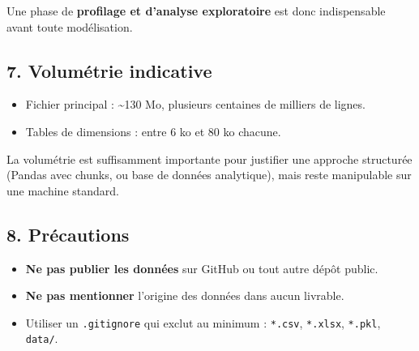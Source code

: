 \documentclass[11pt,a4paper]{article}
\providecommand{\tightlist}{\setlength{\itemsep}{0pt}\setlength{\parskip}{0pt}}
\begin{document}
Une phase de \textbf{profilage et d'analyse exploratoire} est donc
indispensable avant toute modélisation.

\subsection{7. Volumétrie indicative}\label{volumuxe9trie-indicative}

\begin{itemize}
\tightlist
\item
  Fichier principal : \textasciitilde130 Mo, plusieurs centaines de
  milliers de lignes.
\item
  Tables de dimensions : entre 6 ko et 80 ko chacune.
\end{itemize}

La volumétrie est suffisamment importante pour justifier une approche
structurée (Pandas avec chunks, ou base de données analytique), mais
reste manipulable sur une machine standard.

\subsection{8. Précautions}\label{pruxe9cautions}

\begin{itemize}
\tightlist
\item
  \textbf{Ne pas publier les données} sur GitHub ou tout autre dépôt
  public.
\item
  \textbf{Ne pas mentionner} l'origine des données dans aucun livrable.
\item
  Utiliser un \texttt{.gitignore} qui exclut au minimum :
  \texttt{*.csv}, \texttt{*.xlsx}, \texttt{*.pkl}, \texttt{data/}.
\end{itemize}
\end{document}
